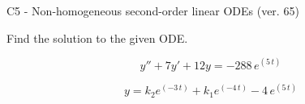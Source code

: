 \begin{exercise}
  \begin{exerciseTitle}C5 - Non-homogeneous second-order linear ODEs (ver. 65)\end{exerciseTitle}
  \begin{exerciseStatement}
    
Find the solution to the given ODE.

    
\[y''+7y'+12y = -288 \, e^{\left(5 \, t\right)}\]

  \end{exerciseStatement}
  \begin{exerciseAnswer}
    
\[y= k_{2} e^{\left(-3 \, t\right)} + k_{1} e^{\left(-4 \, t\right)} - 4 \, e^{\left(5 \, t\right)}\]

  \end{exerciseAnswer}
\end{exercise}